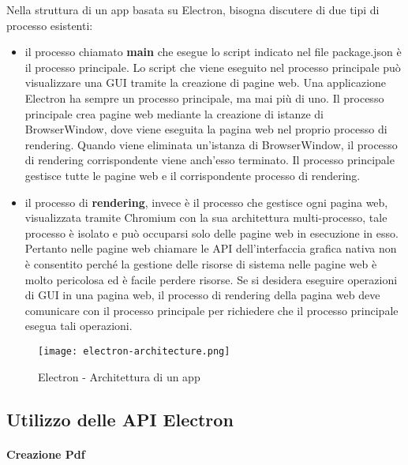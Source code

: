Nella struttura di un app basata su Electron, bisogna discutere di due tipi di processo esistenti:
\begin{itemize}
	\item  il processo chiamato \textbf{main} che esegue lo script indicato nel file package.json è il processo principale. Lo script che viene eseguito nel processo principale può visualizzare una \Gls{GUI} tramite la creazione di pagine web. Una applicazione Electron ha sempre un 		processo principale, ma mai più di uno. Il processo principale crea pagine web mediante la creazione di istanze di BrowserWindow, dove viene eseguita la pagina web nel proprio processo di rendering. Quando viene eliminata un'istanza di BrowserWindow, il processo di 		rendering corrispondente viene anch'esso terminato. Il processo principale gestisce tutte le pagine web e il corrispondente processo di rendering.
	\item il processo di \textbf{rendering}, invece è il processo che gestisce ogni pagina web, visualizzata tramite Chromium con la sua architettura multi-processo, tale processo è isolato e può occuparsi solo delle pagine web in esecuzione in esso.
	Pertanto nelle pagine web chiamare le API dell'interfaccia grafica nativa non è consentito perché la gestione delle risorse di sistema nelle pagine web è molto pericolosa ed è facile perdere risorse. Se si desidera eseguire operazioni di \Gls{GUI} in una pagina web, il processo di 		rendering della pagina web deve comunicare con il processo principale per richiedere che il processo principale esegua tali operazioni.
\end{itemize}

\begin{figure}[H]
    \centering
    \texttt{[image: electron-architecture.png]}
    \caption{Electron - Architettura di un app}
    \label{fig:ElectronArch}
\end{figure}


\subsection{Utilizzo delle API Electron}



\paragraph {Creazione Pdf}


